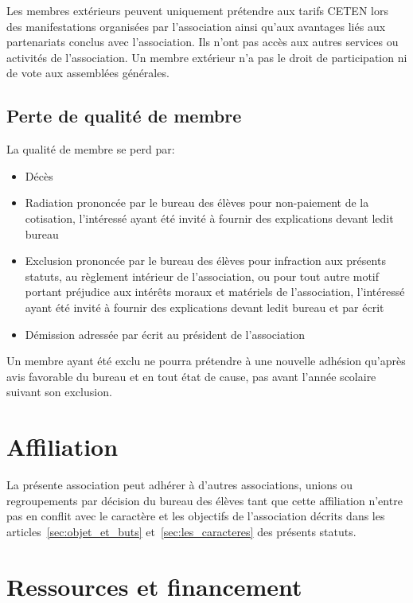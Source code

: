 \documentclass{article}
\begin{document}
				Les membres extérieurs peuvent uniquement prétendre aux tarifs
				CETEN lors des manifestations organisées par l’association ainsi
				qu’aux avantages liés aux partenariats conclus avec
				l’association. Ils n’ont pas accès aux autres services ou
				activités de l’association. Un membre extérieur n’a pas le droit
				de participation ni de vote aux assemblées générales.

		\subsection{Perte de qualité de membre}
\label{sub:perte_de_qualite_de_membre}
			La qualité de membre se perd par:
			\begin{itemize}
				\item Décès
				\item Radiation prononcée par le bureau des élèves pour
					non-paiement de la cotisation, l'intéressé ayant été invité
					à fournir des explications devant ledit bureau
				\item Exclusion prononcée par le bureau des élèves pour
					infraction aux présents statuts, au règlement intérieur de
					l'association, ou pour tout autre motif portant préjudice
					aux intérêts moraux et matériels de l’association,
					l'intéressé ayant été invité à fournir des explications
					devant ledit bureau et par écrit
				\item Démission adressée par écrit au président de l’association
			\end{itemize}

			Un membre ayant été exclu ne pourra prétendre à une nouvelle
			adhésion qu’après avis favorable du bureau et en tout état de cause,
			pas avant l’année scolaire suivant son exclusion.

	\section{Affiliation}
\label{sec:affiliation}
		La présente association peut adhérer à d’autres associations, unions ou
		regroupements par décision du bureau des élèves tant que cette
		affiliation n’entre pas en conflit avec le caractère et les objectifs de
		l’association décrits dans les articles~\ref{sec:objet_et_buts}
		et~\ref{sec:les_caracteres} des présents statuts.

	\section{Ressources et financement}
\end{document}
